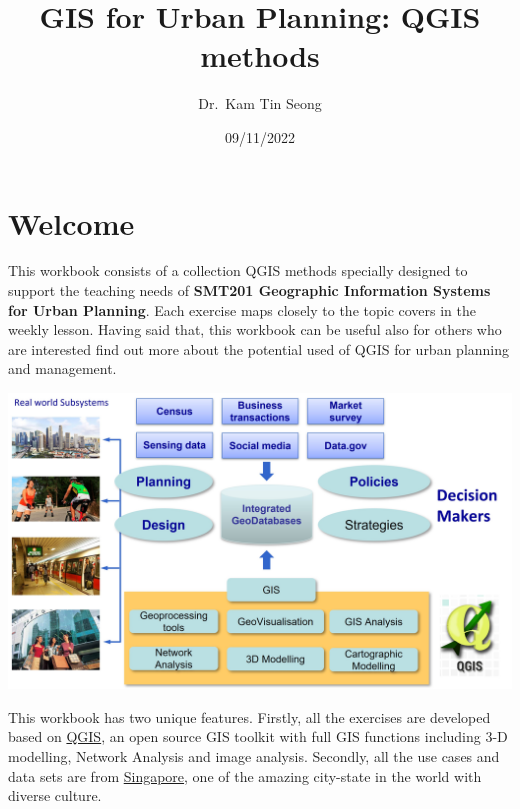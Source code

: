 \documentclass[
  letterpaper,
  DIV=11,
  numbers=noendperiod]{scrreprt}
\title{GIS for Urban Planning: QGIS methods}
\author{Dr.~Kam Tin Seong}
\date{09/11/2022}
\renewcommand*\contentsname{Table of contents}
\newcommand\contentsname{Table of contents}
\begin{document}
\maketitle
\ifdefined\Shaded\renewenvironment{Shaded}{\begin{tcolorbox}[interior hidden, boxrule=0pt, breakable, frame hidden, sharp corners, enhanced, borderline west={3pt}{0pt}{shadecolor}]}{\end{tcolorbox}}\fi

\renewcommand*\contentsname{Table of contents}
{
\hypersetup{linkcolor=}
\setcounter{tocdepth}{2}
\tableofcontents
}

\hypertarget{welcome}{%
\chapter*{Welcome}\label{welcome}}

This workbook consists of a collection QGIS methods specially designed
to support the teaching needs of \textbf{SMT201 Geographic Information
Systems for Urban Planning}. Each exercise maps closely to the topic
covers in the weekly lesson. Having said that, this workbook can be
useful also for others who are interested find out more about the
potential used of QGIS for urban planning and management.

\includegraphics{./img/cover.jpg}

This workbook has two unique features. Firstly, all the exercises are
developed based on \href{https://www.qgis.org/en/site/}{QGIS}, an open
source GIS toolkit with full GIS functions including 3-D modelling,
Network Analysis and image analysis. Secondly, all the use cases and
data sets are from
\href{https://en.wikipedia.org/wiki/Singapore}{Singapore}, one of the
amazing city-state in the world with diverse culture.
\end{document}

